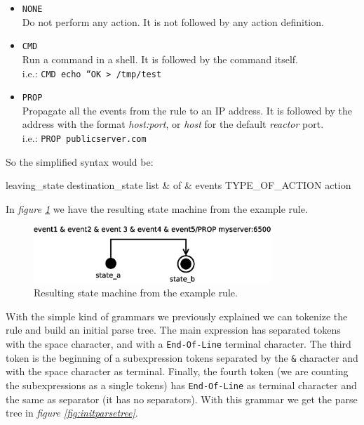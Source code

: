 \begin{itemize}
  \item \texttt{NONE}\\
    Do not perform any action. It is not followed by any action definition.
  \item \texttt{CMD}\\
    Run a command in a shell. It is followed by the command itself.\\
    i.e.:  \texttt{CMD echo ``OK > /tmp/test}
  \item \texttt{PROP}\\
    Propagate all the events from the rule to an IP address. It is followed by the address with the format \emph{host:port}, or \emph{host}
    for the default \emph{reactor} port.\\
    i.e.: \texttt{PROP publicserver.com}
\end{itemize}
So the simplified syntax would be:\\
\begin{center}
  leaving\_state destination\_state list \& of \& events TYPE\_OF\_ACTION action
\end{center}
In \emph{figure \ref{fig:rulesm}} we have the resulting state machine from the example rule.\\
\begin{figure}[t]
  \centering
  \includegraphics[width=0.8\textwidth,keepaspectratio]{img/rulesm}
  \caption{Resulting state machine from the example rule.}
  \label{fig:rulesm}
\end{figure}
With the simple kind of grammars we previously explained we can tokenize the rule and build an initial parse tree. The main expression
has separated tokens with the space character, and with a \texttt{End-Of-Line} terminal character. The third token is the beginning of a 
subexpression tokens separated by the \texttt{\&} character and with the space character as terminal. Finally, the fourth token (we are
counting the subexpressions as a single tokens) has \texttt{End-Of-Line} as terminal character and the same as separator (it has no 
separators). With this grammar we get the parse tree in \emph{figure \ref{fig:initparsetree}}.
